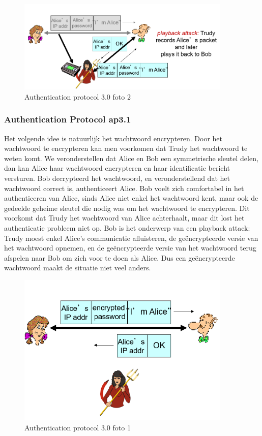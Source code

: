 \begin{figure}[h]
    \centering
    \includegraphics[width=4in]{./img/imghfdst8/hfdst8puntje17.png}
    \caption{Authentication protocol 3.0 foto 2 }      
    \label{fig:Authentication protocol 3.0 foto 2 }
\end{figure}

\newpage

\subsubsection{Authentication Protocol ap3.1}

\noindent Het volgende idee is natuurlijk het wachtwoord encrypteren. Door het wachtwoord te encrypteren kan men voorkomen dat Trudy het wachtwoord te weten komt. We veronderstellen dat Alice en Bob een symmetrische sleutel delen, dan kan Alice haar wachtwoord encrypteren en haar identificatie bericht versturen. Bob decrypteerd het wachtwoord, en veronderstellend dat het wachtwoord correct is, authenticeert Alice. Bob voelt zich comfortabel in het authenticeren van Alice, sinds Alice niet enkel het wachtwoord kent, maar ook de gedeelde geheime sleutel die nodig was om het wachtwoord te encrypteren.
Dit voorkomt dat Trudy het wachtwoord van Alice achterhaalt, maar dit lost het authenticatie probleem niet op. Bob is het onderwerp van een playback attack: Trudy moest enkel Alice’s communicatie afluisteren, de geëncrypteerde versie van het wachtwoord opnemen, en de geëncrypteerde versie van het wachtwoord terug afspelen naar Bob om zich voor te doen als Alice. Dus een geëncrypteerde wachtwoord maakt de situatie niet veel anders.

\begin{figure}[h]
    \centering
    \includegraphics[width=4in]{./img/imghfdst8/hfdst8puntje18.png}
    \caption{Authentication protocol 3.0 foto 1 }      
    \label{fig:Authentication protocol 3.0 foto 1 }
\end{figure}

